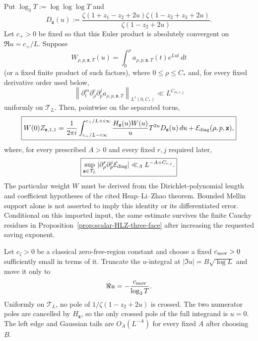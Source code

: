 \begin{hypothesis}
\label{lem:scalar-lagweight-HLZ}
Put $\log_3T:=\log\log\log T$ and
\[
D_{\mathbf z}(u):=
\frac{\zeta(1+z_1-z_2+2u)\zeta(1-z_2+z_3+2u)}
     {\zeta(1-z_2+2u)}.
\]
Let $c_+>0$ be fixed so that this Euler product is absolutely convergent on
$\Re u=c_+/L$.  Suppose
\begin{equation}
W_{\rho,p,\mathbf z,T}(u)
=\int_0^\rho a_{\rho,p,\mathbf z,T}(t)e^{Lut}\,dt
\label{eq:scalar-HLZ-admissible-weight}
\end{equation}
(or a fixed finite product of such factors), where $0\le\rho\le C_*$ and, for
every fixed derivative order used below,
\begin{equation}
\left\|\partial_t^m\partial_\rho^r\partial_p^j
 a_{\rho,p,\mathbf z,T}\right\|_{L^1(0,C_*)}
\ll L^{C_{m,r,j}}
\label{eq:scalar-HLZ-weight-bounds}
\end{equation}
uniformly on $\mathcal T_L$.  Then, pointwise on the separated torus,
\begin{equation}
\boxed{
W(0)Z_{\mathbf z,1,1}
=\frac1{2\pi i}\int_{c_+/L-i\infty}^{c_+/L+i\infty}
\frac{H_{\mathbf z}(u)W(u)}u T^{2u}D_{\mathbf z}(u)\,du
+\mathcal E_{\rm diag}(\rho,p,\mathbf z),
}
\label{eq:scalar-HLZ-diagonal}
\end{equation}
where, for every prescribed $A>0$ and every fixed $r,j$ required later,
\begin{equation}
\boxed{
\sup_{\mathbf z\in\mathcal T_L}
|\partial_\rho^r\partial_p^j\mathcal E_{\rm diag}|
\ll_A L^{-A+C_{r,j}}.
}
\label{eq:scalar-HLZ-error}
\end{equation}
The particular weight $W$ must be derived from the Dirichlet-polynomial
length and coefficient hypotheses of the cited Heap--Li--Zhao theorem.
Bounded Mellin support alone is not asserted to imply this identity or its
differentiated error.  Conditional on this imported input, the same estimate survives the finite Cauchy residues in
Proposition~\ref{prop:scalar-HLZ-three-face} after increasing the requested
saving exponent.
\end{hypothesis}

\begin{lemma}
\label{lem:scalar-zero-free-deformation}
Let $c_\zeta>0$ be a classical zero-free-region constant and choose a fixed
$c_{\rm mov}>0$ sufficiently small in terms of it.  Truncate the $u$-integral
at $|\Im u|=B\sqrt{\log L}$ and move it only to
\[
\Re u=-\frac{c_{\rm mov}}{\log_3T}.
\]
Uniformly on $\mathcal T_L$, no pole of
$1/\zeta(1-z_2+2u)$ is crossed.  The two numerator poles are cancelled by
$H_{\mathbf z}$, so the only crossed pole of the full integrand is $u=0$.
The left edge and Gaussian tails are $O_A(L^{-A})$ for every fixed $A$ after
choosing $B$.
\end{lemma}

